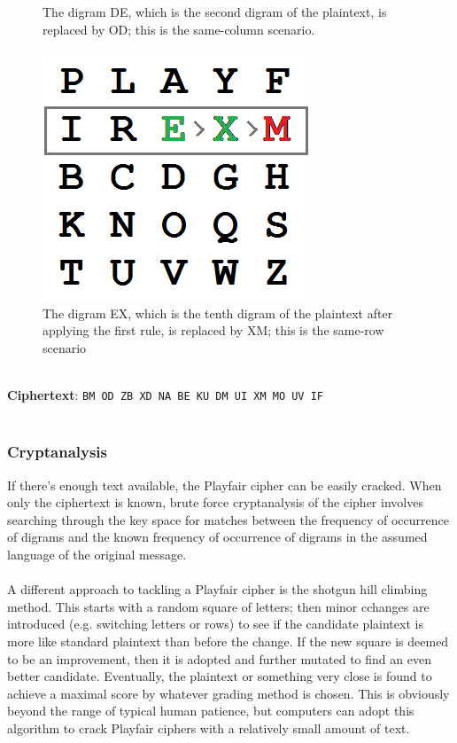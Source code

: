 \documentclass[Lau,binding=0.6cm,oneside]{sapthesis}
\begin{document}
\begin{figure}[H]
  \caption{The digram DE, which is the second digram of the plaintext, is replaced by OD; this is the same-column scenario.}
\endminipage\hfill
{}%
  \includegraphics[width=\linewidth]{playfair_10}
  \caption{The digram EX, which is the tenth digram of the plaintext after applying the first rule, is replaced by XM; this is the same-row scenario}
\endminipage
\end{figure}
\ \\
\textbf{Ciphertext}: \colorbox{gray!12}{\small{\texttt{BM OD ZB XD NA BE KU DM UI XM MO UV IF}}}\\\\

\subsubsection{Cryptanalysis}
If there's enough text available, the Playfair cipher can be easily cracked. When only the ciphertext is known, brute force cryptanalysis of the cipher involves searching through the key space for matches between the frequency of occurrence of digrams and the known frequency of occurrence of digrams in the assumed language of the original message.\\\\
A different approach to tackling a Playfair cipher is the shotgun hill climbing method. This starts with a random square of letters; then minor cchanges are introduced (e.g. switching letters or rows) to see if the candidate plaintext is more like standard plaintext than before the change. If the new square is deemed to be an improvement, then it is adopted and further mutated to find an even better candidate. Eventually, the plaintext or something very close is found to achieve a maximal score by whatever grading method is chosen. This is obviously beyond the range of typical human patience, but computers can adopt this algorithm to crack Playfair ciphers with a relatively small amount of text.\\\\
\end{document}
